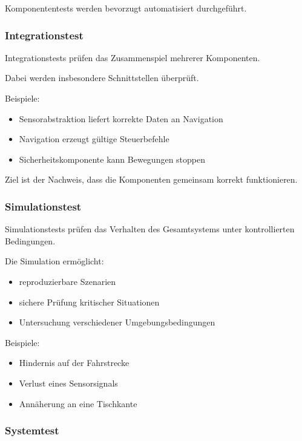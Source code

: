 \documentclass[
  a4paper,
  12pt,
  DIV=12,        %
  parskip=half,  %
  headings=small %
]{scrartcl}
\theoremstyle{definition}
\providecommand{\tightlist}{%
  \setlength{\itemsep}{0pt}\setlength{\parskip}{0pt}}
\theoremstyle{definition}
\begin{document}
Komponententests werden bevorzugt automatisiert durchgeführt.

\subsubsection{Integrationstest}\label{integrationstest}

Integrationstests prüfen das Zusammenspiel mehrerer Komponenten.

Dabei werden insbesondere Schnittstellen überprüft.

Beispiele:

\begin{itemize}
\tightlist
\item
  Sensorabstraktion liefert korrekte Daten an Navigation
\item
  Navigation erzeugt gültige Steuerbefehle
\item
  Sicherheitskomponente kann Bewegungen stoppen
\end{itemize}

Ziel ist der Nachweis, dass die Komponenten gemeinsam korrekt
funktionieren.

\subsubsection{Simulationstest}\label{simulationstest}

Simulationstests prüfen das Verhalten des Gesamtsystems unter
kontrollierten Bedingungen.

Die Simulation ermöglicht:

\begin{itemize}
\tightlist
\item
  reproduzierbare Szenarien
\item
  sichere Prüfung kritischer Situationen
\item
  Untersuchung verschiedener Umgebungsbedingungen
\end{itemize}

Beispiele:

\begin{itemize}
\tightlist
\item
  Hindernis auf der Fahrstrecke
\item
  Verlust eines Sensorsignals
\item
  Annäherung an eine Tischkante
\end{itemize}

\subsubsection{Systemtest}\label{systemtest}
\end{document}
